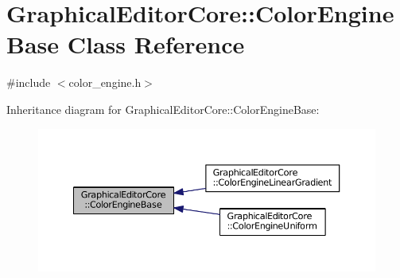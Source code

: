 \hypertarget{classGraphicalEditorCore_1_1ColorEngineBase}{}\section{Graphical\+Editor\+Core\+:\+:Color\+Engine\+Base Class Reference}
\label{classGraphicalEditorCore_1_1ColorEngineBase}


{\ttfamily \#include $<$color\+\_\+engine.\+h$>$}



Inheritance diagram for Graphical\+Editor\+Core\+:\+:Color\+Engine\+Base\+:
\nopagebreak
\begin{figure}[H]
\begin{center}
\leavevmode
\includegraphics[width=350pt]{classGraphicalEditorCore_1_1ColorEngineBase__inherit__graph}
\end{center}
\end{figure}
